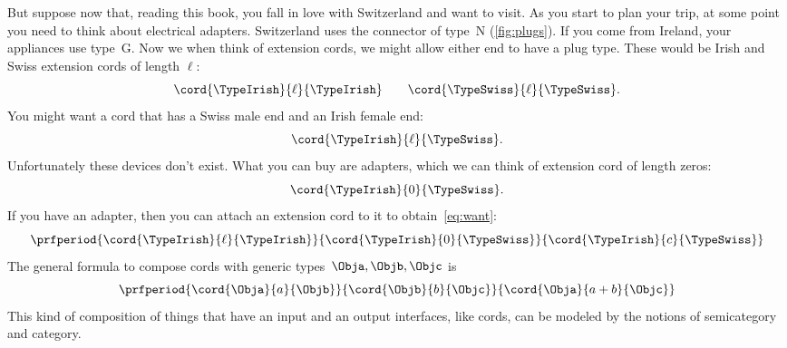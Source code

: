 But suppose now that, reading this book, you fall in love with Switzerland and want to visit.
As you start to plan your trip, at some point you need to think about electrical adapters.
Switzerland uses the connector of type~N (\cref{fig:plugs}).
If you come from Ireland, your appliances use type~G.
Now we when think of extension cords, we might allow either end to have a plug type.
%
These would be Irish and Swiss extension cords of length $\ell$:
%
\begin{equation}
	\label{eq:irish-swiss}
	\cord{\TypeIrish}{\ell}{\TypeIrish} \qquad \cord{\TypeSwiss}{\ell}{\TypeSwiss}.
\end{equation}
%
You might want a cord that has a Swiss male end and an Irish female end:
%
\begin{equation}
	\label{eq:want}
	\cord{\TypeIrish}{\ell}{\TypeSwiss}.
\end{equation}
%
Unfortunately these devices don't exist.
What you can buy are adapters, which we can think of extension cord of length zeros:
\begin{equation}
	\cord{\TypeIrish}{0}{\TypeSwiss}.
\end{equation}
%
If you have an adapter, then you can attach an extension cord to it to obtain~\cref{eq:want}:
%
\begin{equation}
	\label{eq:irish-swiss-result}
	\prfperiod{\cord{\TypeIrish}{\ell}{\TypeIrish}}{\cord{\TypeIrish}{0}{\TypeSwiss}}{\cord{\TypeIrish}{c}{\TypeSwiss}}
\end{equation}
%
The general formula to compose cords with generic types~$\Obja, \Objb, \Objc$ is
%
\begin{equation}
	\label{eq:cords-generic}
	\prfperiod{\cord{\Obja}{a}{\Objb}}{\cord{\Objb}{b}{\Objc}}{\cord{\Obja}{a+b}{\Objc}}
\end{equation}
%
This kind of composition of things that have an input and an output interfaces, like cords, can be modeled by the notions of semicategory and category.

%

%
%
%

